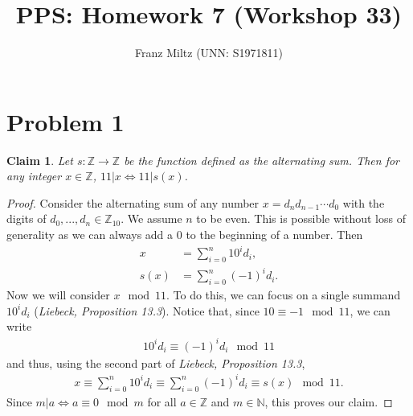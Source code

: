 \documentclass{article}
\title{PPS: Homework 7 (Workshop 33)}
\author{Franz Miltz (UNN: S1971811)}
\newcommand{\N}{\mathbb{N}}
\newcommand{\Z}{\mathbb{Z}}
\newtheorem{claim}[section]{Claim}
\begin{document}
\maketitle
\section*{Problem 1}
\begin{claim}
  Let $s:\Z \to \Z$ be the function defined as the alternating sum. Then for any integer $x\in\Z$, $11|x \Leftrightarrow 11|s(x)$.
\end{claim}
\begin{proof}
  Consider the alternating sum of any number $x=d_nd_{n-1}\cdots d_0$ with the digits of $d_0,...,d_n\in\Z_{10}$.
  We assume $n$ to be even. This is possible without loss of generality as we can always add a $0$ to the beginning of a number.
  Then
  \begin{align*}
    x &= \sum_{i=0}^n 10^id_i,\\
    s(x) &= \sum_{i=0}^n (-1)^id_i.
  \end{align*}
  Now we will consider $x\mod 11$. To do this, we can focus on a single summand $10^id_i$ (\emph{Liebeck, Proposition 13.3}). 
  Notice that, since $10\equiv -1 \mod 11$, we can write
  \begin{align*}
    10^id_i \equiv (-1)^id_i \mod 11
  \end{align*}
  and thus, using the second part of \emph{Liebeck, Proposition 13.3},
  \begin{align*}
  x \equiv \sum_{i=0}^n 10^id_i \equiv \sum_{i=0}^n (-1)^id_i\equiv s(x)\mod 11.
  \end{align*}
  Since $m|a\Leftrightarrow a\equiv 0 \mod m$ for all $a\in\Z$ and $m\in\N$, this proves our claim.
\end{proof}
\end{document}
